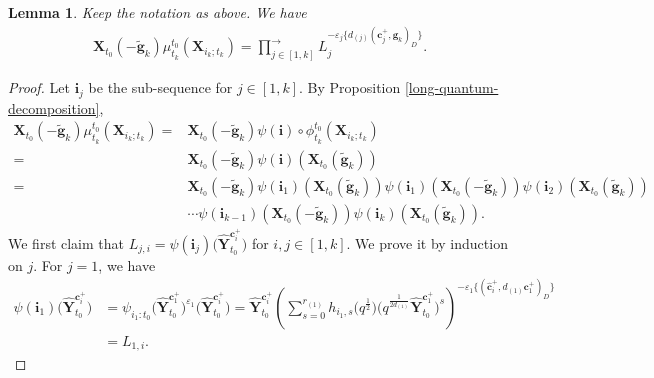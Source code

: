 \documentclass[11pt]{article}
\numberwithin{equation}{section}
\numberwithin{equation}{section}
\newtheorem{Lemma}[Theorem]{Lemma}
\begin{document}
\begin{Lemma}\label{product_of_F_polynomial}
 Keep the notation as above. We have
 \begin{align}\label{eq:f-poly-well-def}
 \mathbf{X}_{t_{0}}(-\mathbf{\tilde{g}}_{k})\mu_{t_{k}}^{t_{0}}(\mathbf{X}_{i_{k};t_{k}})=\prod\limits^{\longrightarrow}_{j\in[1,k]}L_{j}^{-\varepsilon_{j}\{d_{(j)}(\mathbf{c}_{j}^{+},\mathbf{g}_{k})_D\}}.
 \end{align}

\end{Lemma}
\begin{proof}
 Let $\mathbf{i}_{j}$ be the sub-sequence  for $j\in [1,k]$.
 By Proposition \ref{long-quantum-decomposition},
 \begin{align*}
 \mathbf{X}_{t_{0}}(-\mathbf{\tilde{g}}_{k})\mu_{t_{k}}^{t_{0}}(\mathbf{X}_{i_{k};t_{k}})
 ={}&\mathbf{X}_{t_{0}}(-\mathbf{\tilde{g}}_{k})\psi(\mathbf{i})\circ\phi_{t_{k}}^{t_0}(\mathbf{X}_{i_{k};t_{k}})\\
 ={}&\mathbf{X}_{t_{0}}(-\mathbf{\tilde{g}}_{k})\psi(\mathbf{i})(\mathbf{X}_{t_{0}}(\mathbf{\tilde{g}}_{k}))\\
 ={}&\mathbf{X}_{t_{0}}(-\mathbf{\tilde{g}}_{k})\psi(\mathbf{i}_{1})(\mathbf{X}_{t_{0}}(\mathbf{\tilde{g}}_{k}))\psi(\mathbf{i}_{1})(\mathbf{X}_{t_{0}}(-\mathbf{\tilde{g}}_{k}))\psi(\mathbf{i}_{2})(\mathbf{X}_{t_{0}}(\mathbf{\tilde{g}}_{k}))\\
 &\cdots\psi(\mathbf{i}_{k-1})(\mathbf{X}_{t_{0}}(-\mathbf{\tilde{g}}_{k}))\psi(\mathbf{i}_{k})(\mathbf{X}_{t_{0}}(\mathbf{\tilde{g}}_{k})).
 \end{align*}
 We first claim that $L_{j,i}=\psi(\mathbf{i}_{j})\bigl(\mathbf{\hat{Y}}_{t_{0}}^{\mathbf{c}_{i}^{+}}\bigr)$
 for $i,j\in[1,k]$. We prove it by induction on $j$.
 For $j=1$, we have
 \begin{align*}
 \psi(\mathbf{i}_{1})\bigl(\mathbf{\hat{Y}}_{t_{0}}^{\mathbf{c}_{i}^{+}}\bigr)
 &=\psi_{i_{1}:t_{0}}\bigl(\mathbf{\hat{Y}}_{t_{0}}^{\mathbf{c}_{1}^{+}}\bigr)^{\varepsilon_{1}}\bigl(\mathbf{\hat{Y}}_{t_{0}}^{\mathbf{c}_{i}^{+}}\bigr)=\mathbf{\hat{Y}}_{t_{0}}^{\mathbf{c}_{i}^{+}}\left(\sum\limits^{r_{(1)}}_{s=0}h_{i_{1},s}\bigl(q^{\frac{1}{2}}\bigr)
 \bigl(q^{\frac{1}{2d_{(1)}}}\mathbf{\hat{Y}}_{t_{0}}^{\mathbf{c}_{1}^{+}}\bigr)^{s}\right)^{-\varepsilon_{1}\{(\mathbf{\hat{c}}_{i}^{+},d_{(1)}\mathbf{c}_{1}^{+})_{D}\}}\\
 &=L_{1,i}.
 \end{align*}

\end{proof}
\end{document}
